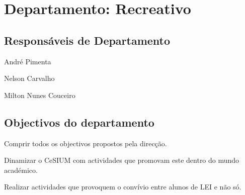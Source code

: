 \section{Departamento: Recreativo}

\subsection{Responsáveis de Departamento}
\begin{itemizedash}
	\item André Pimenta
	\item Nelson Carvalho
	\item Milton Nunes Couceiro
\end{itemizedash}

\subsection{Objectivos do departamento}
\lipsum[2]
\begin{itemizedash}
	\item Comprir todos os objectivos propostos pela direcção.
	\item Dinamizar o CeSIUM com actividades que promovam este dentro do  mundo académico.
	\item Realizar actividades que provoquem o convívio entre alunos de LEI e não só.
\end{itemizedash}
